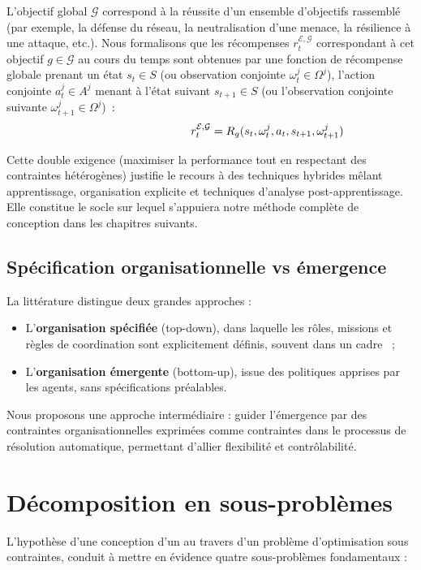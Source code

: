 \noindent L'objectif global $\mathcal{G}$ correspond à la réussite d'un ensemble d'objectifs rassemblé (par exemple, la défense du réseau, la neutralisation d'une menace, la résilience à une attaque, etc.). Nous formalisons que les récompenses $r^{\mathcal{E}, \mathcal{G}}_t$ correspondant à cet objectif $g \in \mathcal{G}$ au cours du temps sont obtenues par une fonction de récompense globale prenant un état $s_t \in S$ (ou observation conjointe $\omega^j_t \in \Omega^j$), l'action conjointe $a^j_t \in A^j$ menant à l'état suivant $s_{t+1} \in S$ (ou l'observation conjointe suivante $\omega^j_{t+1} \in \Omega^j$)~:
%
\[
  \hspace{3.5cm}r^{\mathcal{E}, \mathcal{G}}_t = R_{g}(s_t, \omega^j_t, a_t, s_{t+1}, \omega^j_{t+1})
\]

\noindent
Cette double exigence (maximiser la performance tout en respectant des contraintes hétérogènes) justifie le recours à des techniques hybrides mêlant apprentissage, organisation explicite et techniques d'analyse post-apprentissage. Elle constitue le socle sur lequel s'appuiera notre méthode complète de conception dans les chapitres suivants.


\subsection{Spécification organisationnelle vs émergence}

La littérature distingue deux grandes approches :
\begin{itemize}
  \item L'\textbf{organisation spécifiée} (top-down), dans laquelle les rôles, missions et règles de coordination sont explicitement définis, souvent dans un cadre ~;
  \item L'\textbf{organisation émergente} (bottom-up), issue des politiques apprises par les agents, sans spécifications préalables.
\end{itemize}

Nous proposons une approche intermédiaire : guider l'émergence par des contraintes organisationnelles exprimées comme contraintes dans le processus de résolution automatique, permettant d'allier flexibilité et contrôlabilité.

\section{Décomposition en sous-problèmes}

L'hypothèse d'une conception d'un  au travers d'un problème d'optimisation sous contraintes, conduit à mettre en évidence quatre sous-problèmes fondamentaux :

